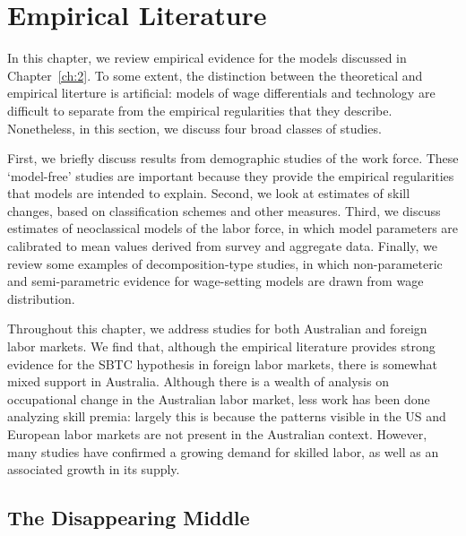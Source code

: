 \chapter{Empirical Literature}\label{ch:3}

In this chapter, we review empirical evidence for the models discussed in Chapter~\ref{ch:2}. To some extent, the distinction between the theoretical and empirical literture is artificial: models of wage differentials and technology are difficult to separate from the empirical regularities that they describe. Nonetheless, in this section, we discuss four broad classes of studies.

First, we briefly discuss results from demographic studies of the work force. These `model-free' studies are important because they provide the empirical regularities that models are intended to explain. Second, we look at estimates of skill changes, based on classification schemes and other measures. Third, we discuss estimates of neoclassical models of the labor force, in which model parameters are calibrated to mean values derived from survey and aggregate data. Finally, we review some examples of decomposition-type studies, in which non-parameteric and semi-parametric evidence for wage-setting models are drawn from wage distribution.

Throughout this chapter, we address studies for both Australian and foreign labor markets. We find that, although the empirical literature provides strong evidence for the SBTC hypothesis in foreign labor markets, there is somewhat mixed support in Australia. Although there is a wealth of analysis on occupational change in the Australian labor market, less work has been done analyzing skill premia: largely this is because the patterns visible in the US and European labor markets are not present in the Australian context. However, many studies have confirmed a growing demand for skilled labor, as well as an associated growth in its supply.

\section{The Disappearing Middle}




